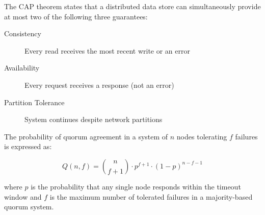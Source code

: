 \documentclass[12pt]{article}
\begin{document}
The CAP theorem states that a distributed data store can simultaneously
provide at most two of the following three guarantees:

\begin{description}
  \item[Consistency] Every read receives the most recent write or an error
  \item[Availability] Every request receives a response (not an error)
  \item[Partition Tolerance] System continues despite network partitions
\end{description}

The probability of quorum agreement in a system of $n$ nodes
tolerating $f$ failures is expressed as:

\vspace{4pt}
\[
  Q(n, f) = \binom{n}{f+1} \cdot p^{f+1} \cdot (1-p)^{n-f-1}
\]

where $p$ is the probability that any single node responds within
the timeout window and $f$ is the maximum number of tolerated failures
in a majority-based quorum system.
\end{document}
